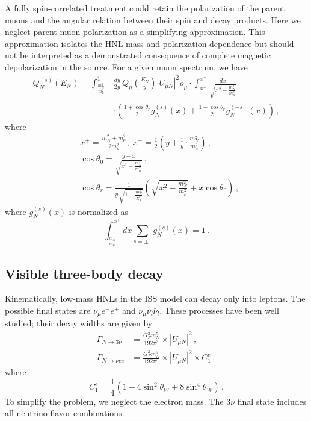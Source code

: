 \documentclass{ws-ijmpa}
\begin{document}
A fully spin-correlated treatment could retain the polarization 
of the parent muons and the angular relation between their 
spin and decay products. Here we neglect parent-muon polarization
as a simplifying approximation. This approximation isolates 
the HNL mass and polarization dependence but should not be
interpreted as a demonstrated consequence of complete magnetic 
depolarization in the source. For a given muon spectrum, we have
\begin{align}
  Q_N^{(s)}(E_N) = \int_{\frac{m_N^2}{m_\mu^2}}^{1} & \frac{d y}{2y} \, Q_\mu(\frac{E_N}{y}) |U_{\mu N}|^2 \rho_\mu \nonumber \cdot \int_{x^-}^{x^+}  \frac{d x}{\sqrt{x^2 - \frac{m_N^2}{m_\mu^2}}} \nonumber \\
  & \cdot \left(\frac{1 + \cos\theta_r}{2} g_N^{(s)}(x) + \frac{1 - \cos\theta_r}{2} g_N^{(-s)}(x)\right)\,, \label{eq:muon_lab_HNL_spec}
\end{align}
where
\begin{align}
  &x^+ = \frac{m_N^2 + m_\mu^2}{2 m_\mu^2}, \; x^- = \frac{1}{2} \left( y + \frac{1}{y} \cdot \frac{m_N^2}{m_\mu^2}\right)\,, \\
  &\cos\theta_0 = \frac{y - x}{\sqrt{x^2 - \frac{m_N^2}{m_\mu^2}}}\,, \\
  &\cos\theta_r = \frac{1}{y \, \sqrt{1 - \frac{m_N^2}{E_N^2}}}\left( \sqrt{x^2 - \frac{m_N^2}{m_\mu^2}} + x \cos\theta_0\right)\,,
\end{align}
where $g^{(s)}_N(x)$ is normalized as
\begin{equation}
  \int^{x^+}_{\frac{m_N}{m_\mu}} dx \sum_{s=\pm 1} g^{(s)}_N(x) = 1\,.
\end{equation}

\subsection{Visible three-body decay}\label{sec:visible_decay}

Kinematically, low-mass HNLs in the ISS model can decay only into leptons.
The possible final states are $\nu_\mu e^- e^+$ and
$\nu_\mu \nu_l \bar{\nu}_l$. These processes have been well
studied\cite{Bondarenko_2018, Atre_2009, Gorbunov_2007};
their decay widths are given by
\begin{align}
  \Gamma_{N \to 3\nu}          & = \frac{G_F^2 m_N^5}{192 \pi^3} \times |U_{\mu N}|^2\,, \label{eq:HNL_3nu_decay}               \\
  \Gamma_{N \to \nu e \bar{e}} & = \frac{G_F^2 m_N^5}{192 \pi^3} \times |U_{\mu N}|^2 \times C_1^e\,, \label{eq:HNL_nuee_decay}
\end{align}
where
\begin{equation}
  C_1^e = \frac{1}{4}\left(1 - 4 \sin^2 \theta_W + 8 \sin^4 \theta_W\right)\,.
\end{equation}
To simplify the problem, we neglect the electron mass. The $3\nu$ final state
includes all neutrino flavor combinations.
\end{document}
